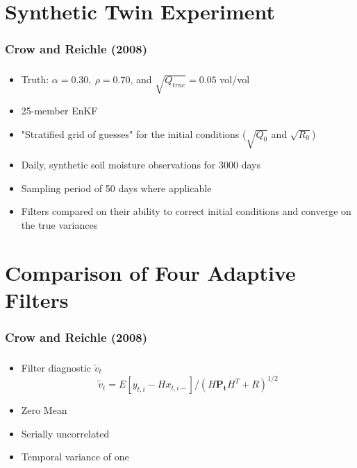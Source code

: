 \documentclass[mathserif]{beamer}
\begin{document}
\section{Synthetic Twin Experiment}

\begin{frame}
  \frametitle{Crow and Reichle (2008)}
  \tableofcontents[currentsection]
\end{frame}

\begin{frame}
  \frametitle{\insertsection}
  \begin{itemize}
    \item Truth: $\alpha = 0.30,\ \rho= 0.70$, and $\sqrt{Q_{true}} = 0.05$ vol/vol
    \item 25-member EnKF
    \item "Stratified grid of guesses" for the initial conditions ($\sqrt{Q_0}$ and $\sqrt{R_0}$)
    \item Daily, synthetic soil moisture observations for 3000 days
    \item Sampling period of 50 days where applicable
    \item Filters compared on their ability to correct initial conditions and converge on the true variances
  \end{itemize}
\end{frame}

\section{Comparison of Four Adaptive Filters}

\begin{frame}
  \frametitle{Crow and Reichle (2008)}
  \tableofcontents[currentsection]
\end{frame}

\begin{frame}
  \frametitle{\insertsection}
  \begin{itemize}
    \item Filter diagnostic $\tilde{v}_t$
    \begin{equation} \tilde{v}_t = E \left[ y_{t,i}-Hx_{t,i-} \right]/(H\mathbf{P_t}H^T+R)^{1/2}\end{equation}
    \item Zero Mean
    \item Serially uncorrelated
    \item Temporal variance of one
  \end{itemize}
\end{frame}
\end{document}
